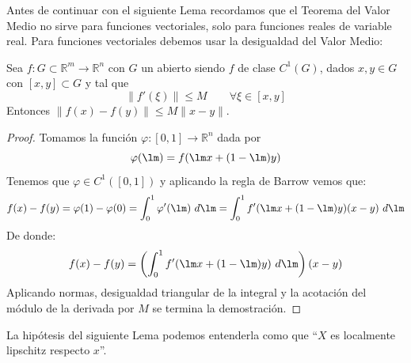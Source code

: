 \noindent
Antes de continuar con el siguiente Lema recordamos que el Teorema del Valor Medio no sirve para funciones vectoriales, solo para funciones reales de variable real. Para funciones vectoriales debemos usar la desigualdad del Valor Medio:
\begin{teo}
    Sea $f:G\subset \mathbb{R}^m\to \mathbb{R}^n$ con $G$ un abierto siendo $f$ de clase $C^1(G)$, dados $x,y\in G$ con $[x,y]\subset G$ y tal que
    \begin{equation*}
        \|f'(\xi)\| \leq M \qquad \forall \xi \in [x,y]
    \end{equation*}
    Entonces $\|f(x) - f(y)\| \leq M \|x-y\|$.
    \begin{proof}
        Tomamos la función $\varphi:[0,1]\to \mathbb{R}^n$ dada por
        \begin{equation*}
            \varphi(\lm) = f(\lm x + (1-\lm)y)
        \end{equation*}
        Tenemos que $\varphi \in C^1([0,1])$ y aplicando la regla de Barrow vemos que:
        \begin{equation*}
            f(x) - f(y) = \varphi(1) - \varphi(0) = \int_{0}^{1} \varphi'(\lm)~d\lm = \int_{0}^{1} f'(\lm x + (1-\lm)y)(x-y)~d\lm 
        \end{equation*}
        De donde:
        \begin{equation*}
            f(x) - f(y) = \left(\int_{0}^{1} f'(\lm x + (1-\lm)y)~d\lm \right)(x-y)
        \end{equation*}
        Aplicando normas, desigualdad triangular de la integral y la acotación del módulo de la derivada por $M$ se termina la demostración.
    \end{proof}
\end{teo}

\noindent
La hipótesis del siguiente Lema podemos entenderla como que ``$X$ es localmente lipschitz respecto $x$''.

